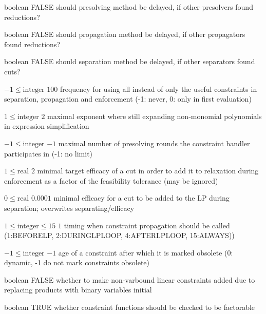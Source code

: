 %
{boolean}%
{FALSE}%
{should presolving method be delayed, if other presolvers found reductions?}%
{}

%
{boolean}%
{FALSE}%
{should propagation method be delayed, if other propagators found reductions?}%
{}

%
{boolean}%
{FALSE}%
{should separation method be delayed, if other separators found cuts?}%
{}

%
{$-1\leq\textrm{integer}$}%
{$100$}%
{frequency for using all instead of only the useful constraints in separation, propagation and enforcement (-1: never, 0: only in first evaluation)}%
{}

%
{$1\leq\textrm{integer}$}%
{$2$}%
{maximal exponent where still expanding non-monomial polynomials in expression simplification}%
{}

%
{$-1\leq\textrm{integer}$}%
{$-1$}%
{maximal number of presolving rounds the constraint handler participates in (-1: no limit)}%
{}

%
{$1\leq\textrm{real}$}%
{$2$}%
{minimal target efficacy of a cut in order to add it to relaxation during enforcement as a factor of the feasibility tolerance (may be ignored)}%
{}

%
{$0\leq\textrm{real}$}%
{$0.0001$}%
{minimal efficacy for a cut to be added to the LP during separation; overwrites separating/efficacy}%
{}

%
{$1\leq\textrm{integer}\leq15$}%
{$1$}%
{timing when constraint propagation should be called (1:BEFORELP, 2:DURINGLPLOOP, 4:AFTERLPLOOP, 15:ALWAYS))}%
{}

%
{$-1\leq\textrm{integer}$}%
{$-1$}%
{age of a constraint after which it is marked obsolete (0: dynamic, -1 do not mark constraints obsolete)}%
{}

%
{boolean}%
{FALSE}%
{whether to make non-varbound linear constraints added due to replacing products with binary variables initial}%
{}

%
{boolean}%
{TRUE}%
{whether constraint functions should be checked to be factorable}%
{}


